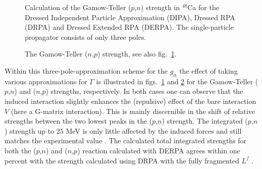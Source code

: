 %
%
%
\begin{figure}
\centerline{
}
\caption[]{
Calculation of the Gamow-Teller ($p$,$n$) strength in $^{48}$Ca for 
the Dressed Independent Particle Approximation (DIPA), Dressed RPA (DRPA) and
Dressed Extended RPA (DERPA).
The single-particle propagator consists of only three poles. 
\label{fig:DERPApn}}
\end{figure}
%
%
\begin{figure}
\centerline{
}
\caption[]{
The Gamow-Teller ($n$,$p$) strength, see also fig.~\ref{fig:DERPApn}.
\label{fig:DERPAnp}}
\end{figure}
%
Within this three-pole-approximation scheme for the $g_\alpha$ the effect 
of taking various approximations for $\Gamma$ is illustrated in 
figs.~\ref{fig:DERPApn} and \ref{fig:DERPAnp} for the Gamow-Teller 
($p$,$n$) and ($n$,$p$) strengths, respectively. In both cases one can 
observe that the 
induced interaction slightly enhances the (repulsive) effect of the bare 
interaction $V$ (here a G-matrix interaction). This is mainly discernible 
in the shift of relative strengths between the two lowest peaks in the 
($p$,$n$) 
strength. The integrated ($p$,$n$) strength up to $25$ MeV is only little 
affected by the induced forces and still matches the experimental value  
\cite{RGBA93}.
The calculated total integrated strengths for both the ($p$,$n$) and ($n$,$p$) 
reaction calculated with DERPA  agrees within one percent with the strength 
calculated using DRPA with the fully fragmented $L^f$ \cite{RGBA93}. 
